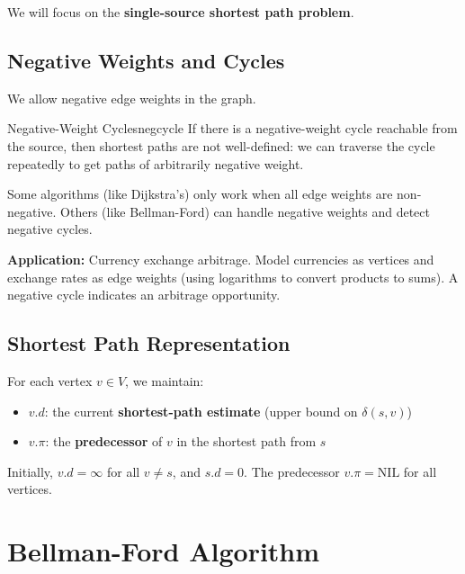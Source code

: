 We will focus on the \textbf{single-source shortest path problem}.

\subsection{Negative Weights and Cycles}

We allow negative edge weights in the graph.

\begin{remark}{Negative-Weight Cycles}{negcycle}
If there is a negative-weight cycle reachable from the source, then shortest paths are 
not well-defined: we can traverse the cycle repeatedly to get paths of arbitrarily negative weight.

Some algorithms (like Dijkstra's) only work when all edge weights are non-negative. 
Others (like Bellman-Ford) can handle negative weights and detect negative cycles.
\end{remark}

\textbf{Application:} Currency exchange arbitrage. Model currencies as vertices and exchange 
rates as edge weights (using logarithms to convert products to sums). A negative cycle indicates 
an arbitrage opportunity.

\subsection{Shortest Path Representation}

For each vertex $v \in V$, we maintain:
\begin{itemize}[noitemsep]
  \item $v.d$: the current \textbf{shortest-path estimate} (upper bound on $\delta(s,v)$)
  \item $v.\pi$: the \textbf{predecessor} of $v$ in the shortest path from $s$
\end{itemize}

Initially, $v.d = \infty$ for all $v \neq s$, and $s.d = 0$. The predecessor $v.\pi = \text{NIL}$ 
for all vertices.

\section*{Bellman-Ford Algorithm}

